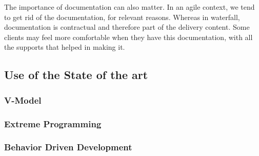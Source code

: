 The importance of documentation can also matter.
In an agile context, we tend to get rid of the documentation, for relevant
reasons.
Whereas in waterfall, documentation is contractual and therefore part of the
delivery content.
Some clients may feel more comfortable when they have this documentation,
with all the supports that helped in making it.

\subsection{Use of the State of the art}\label{subsec:use-of-the-state-of-the-art}

\subsubsection{V-Model}

\subsubsection{Extreme Programming}

\subsubsection{Behavior Driven Development}
